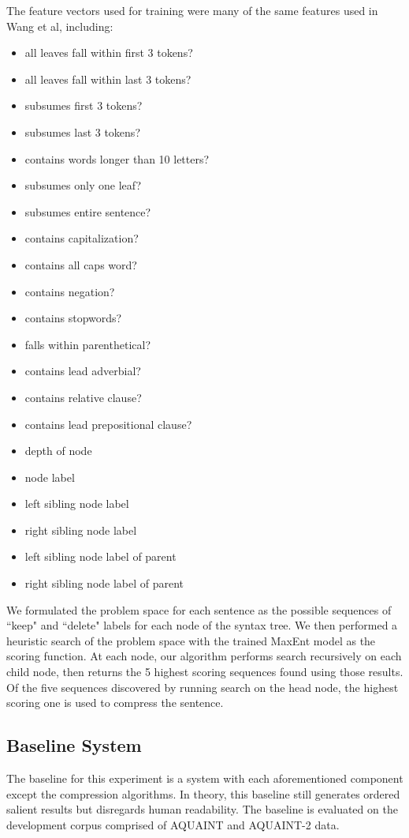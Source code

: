 \documentclass[11pt]{article}
\begin{document}
The feature vectors used for training were many of the same features used in Wang et al, including:
\begin{itemize}
\item all leaves fall within first 3 tokens?
\item all leaves fall within last 3 tokens?
\item subsumes first 3 tokens?
\item subsumes last 3 tokens?
\item contains words longer than 10 letters?
\item subsumes only one leaf?
\item subsumes entire sentence?
\item contains capitalization?
\item contains all caps word?
\item contains negation?
\item contains stopwords?
\item falls within parenthetical?
\item contains lead adverbial?
\item contains relative clause?
\item contains lead prepositional clause?
\item depth of node
\item node label
\item left sibling node label
\item right sibling node label
\item left sibling node label of parent
\item right sibling node label of parent
\end{itemize}

We formulated the problem space for each sentence as the possible sequences of ``keep" and ``delete" labels for each node of the syntax tree. We then performed a heuristic search of the problem space with the trained MaxEnt model as the scoring function. At each node, our algorithm performs search recursively on each child node, then returns the 5 highest scoring sequences found using those results. Of the five sequences discovered by running search on the head node, the highest scoring one is used to compress the sentence.

\subsection{Baseline System}
The baseline for this experiment is a system with each aforementioned component except the compression algorithms. In theory, this baseline still generates ordered salient results but disregards human readability. The baseline is evaluated on the development corpus comprised of AQUAINT and AQUAINT-2 data.
\end{document}
